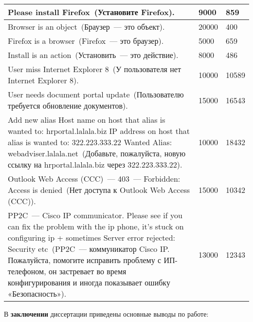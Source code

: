 \begin{longtable}{|p{12cm}|p{2cm}|p{2cm}|}
  \hline
  Please install Firefox~(Установите Firefox).   & 9000 & 859 \\
  \hline
  Browser is an object~(Браузер~--- это объект).   & 20000 & 400 \\
  \hline
  Firefox is a browser~(Firefox~--- это браузер).   & 5000 & 659  \\
  \hline
  Install is an action~(Установить~--- это действие).   & 8000 & 486 \\
  \hline
  User miss Internet Explorer 8~(У пользователя нет Internet Explorer 8).     & 10000 & 10589 \\
  \hline
  User needs document portal update~(Пользователю требуется обновление документов).    & 15000 & 16543 \\
  \hline
  Add new alias Host name on host that alias is wanted to: hrportal.lalala.biz IP address on host that alias is wanted to: 322.223.333.22 Wanted Alias:    webadviser.lalala.net~(Добавьте, пожалуйста, новую ссылку на hrportal.lalala.biz через 322.223.333.22).    & 10000 & 18432  \\ 
  \hline
  Outlook Web Access (CCC)~--- 403~--- Forbidden: Access is denied~(Нет доступа к Outlook Web Access (CCC)). & 15000 & 10342\\ 
  \hline
  PP2C~--- Cisco IP communicator. Please see if you can fix the problem with the ip phone, it's stuck on configuring ip + sometimes Server error rejected: Security etc~(PP2C~--- коммуникатор Cisco IP. Пожалуйста, помогите исправить проблему с ИП-телефоном, он застревает во время конфигурирования и иногда показывает ошибку «Безопасность»).  & 13000 & 12343 \\ 
   
  \end{longtable}

В \textbf{заключении} диссертации приведены основные выводы по работе:


 

\renewcommand{\refname}{\large Публикации автора по теме диссертации}

\insertbiblioall

